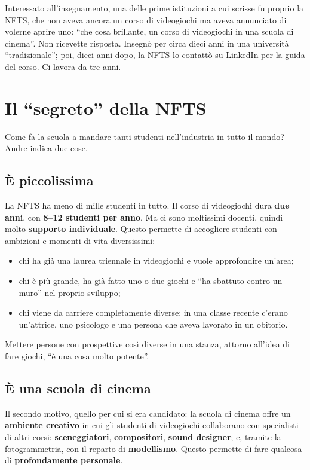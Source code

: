 Interessato all'insegnamento, una delle prime istituzioni a cui scrisse fu proprio
la NFTS, che non aveva ancora un corso di videogiochi ma aveva annunciato di volerne
aprire uno: ``che cosa brillante, un corso di videogiochi in una scuola di cinema''.
Non ricevette risposta. Insegnò per circa dieci anni in una università
``tradizionale''; poi, dieci anni dopo, la NFTS lo contattò su LinkedIn per la
guida del corso. Ci lavora da tre anni.

\section{Il ``segreto'' della NFTS}
\label{sec:c2-4-segreto}

Come fa la scuola a mandare tanti studenti nell'industria in tutto il mondo? Andre
indica due cose.

\subsection{È piccolissima}

La NFTS ha meno di mille studenti in tutto. Il corso di videogiochi dura
\textbf{due anni}, con \textbf{8--12 studenti per anno}. Ma ci sono moltissimi
docenti, quindi molto \textbf{supporto individuale}. Questo permette di accogliere
studenti con ambizioni e momenti di vita diversissimi:
\begin{itemize}
  \item chi ha già una laurea triennale in videogiochi e vuole approfondire un'area;
  \item chi è più grande, ha già fatto uno o due giochi e ``ha sbattuto contro un
        muro'' nel proprio sviluppo;
  \item chi viene da carriere completamente diverse: in una classe recente c'erano
        un'attrice, uno psicologo e una persona che aveva lavorato in un
        obitorio.
\end{itemize}
Mettere persone con prospettive così diverse in una stanza, attorno all'idea di
fare giochi, ``è una cosa molto potente''.

\subsection{È una scuola di cinema}

Il secondo motivo, quello per cui si era candidato: la scuola di cinema offre un
\textbf{ambiente creativo} in cui gli studenti di videogiochi collaborano con
specialisti di altri corsi: \textbf{sceneggiatori}, \textbf{compositori},
\textbf{sound designer}; e, tramite la fotogrammetria, con il reparto di
\textbf{modellismo}. Questo permette di fare qualcosa di \textbf{profondamente
personale}.

